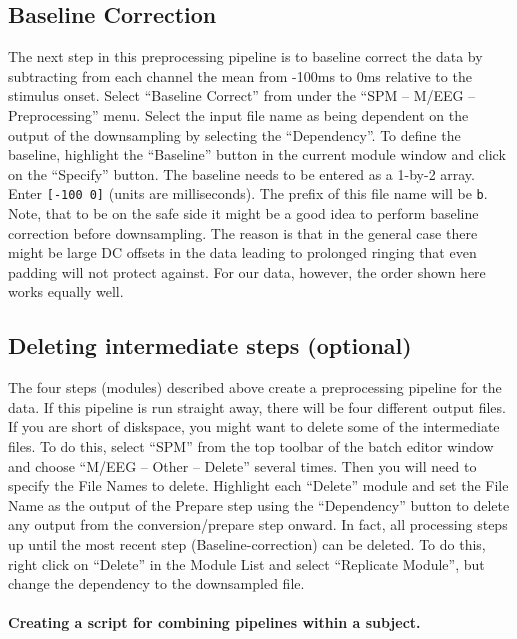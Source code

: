 \subsection{Baseline Correction}

The next step in this preprocessing pipeline is to baseline correct the data by subtracting from each channel the mean from -100ms to 0ms relative to the stimulus onset. Select ``Baseline Correct'' from under the ``SPM -- M/EEG -- Preprocessing'' menu. Select the input file name as being dependent on the output of the downsampling by selecting the ``Dependency''. To define the baseline, highlight the ``Baseline'' button in the current module window and click on the ``Specify'' button. The baseline needs to be entered as a 1-by-2 array. Enter \texttt{[-100 0]} (units are milliseconds). The prefix of this file name will be \texttt{b}. Note, that to be on the safe side it might be a good idea to perform baseline correction before downsampling. The reason is that in the general case there might be large DC offsets in the data leading to prolonged ringing that even padding will not protect against. For our data, however, the order shown here works equally well.

\subsection{Deleting intermediate steps (optional)}

The four steps (modules) described above create a preprocessing pipeline for the data. If this pipeline is run straight away, there will be four different output files. If you are short of diskspace, you might want to delete some of the intermediate files. To do this, select ``SPM'' from the top toolbar of the batch editor window and choose ``M/EEG -- Other -- Delete'' several times. Then you will need to specify the File Names to delete. Highlight each ``Delete'' module and set the File Name as the output of the Prepare step using the ``Dependency'' button to delete any output from the conversion/prepare step onward. In fact, all processing steps up until the most recent step (Baseline-correction) can be deleted. To do this, right click on ``Delete'' in the Module List and select ``Replicate Module'', but change the dependency to the downsampled file. 

\paragraph{Creating a script for combining pipelines within a subject.}

